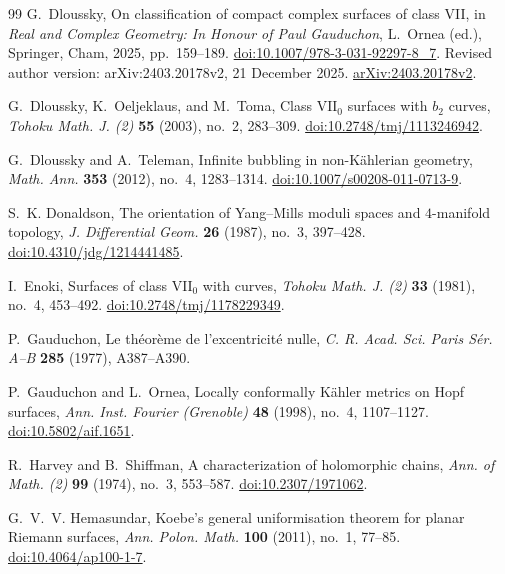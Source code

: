 \begin{thebibliography}{99}
G.~Dloussky, On classification of compact complex surfaces of class VII,
in \emph{Real and Complex Geometry: In Honour of Paul Gauduchon},
L.~Ornea (ed.), Springer, Cham, 2025, pp.~159--189.
\href{https://doi.org/10.1007/978-3-031-92297-8_7}{doi:10.1007/978-3-031-92297-8\_7}.
Revised author version: arXiv:2403.20178v2, 21 December 2025.
\href{https://arxiv.org/abs/2403.20178v2}{arXiv:2403.20178v2}.

G.~Dloussky, K.~Oeljeklaus, and M.~Toma,
Class $\mathrm{VII}_0$ surfaces with $b_2$ curves,
\emph{Tohoku Math. J. (2)} \textbf{55} (2003), no.~2, 283--309.
\href{https://doi.org/10.2748/tmj/1113246942}{doi:10.2748/tmj/1113246942}.

G.~Dloussky and A.~Teleman, Infinite bubbling in non-K\"ahlerian geometry,
\emph{Math. Ann.} \textbf{353} (2012), no.~4, 1283--1314.
\href{https://doi.org/10.1007/s00208-011-0713-9}{doi:10.1007/s00208-011-0713-9}.

S.~K. Donaldson, The orientation of Yang--Mills moduli spaces and
$4$-manifold topology,
\emph{J. Differential Geom.} \textbf{26} (1987), no.~3, 397--428.
\href{https://doi.org/10.4310/jdg/1214441485}{doi:10.4310/jdg/1214441485}.

I.~Enoki, Surfaces of class $\mathrm{VII}_0$ with curves,
\emph{Tohoku Math. J. (2)} \textbf{33} (1981), no.~4, 453--492.
\href{https://doi.org/10.2748/tmj/1178229349}{doi:10.2748/tmj/1178229349}.

P.~Gauduchon, Le th\'eor\`eme de l'excentricit\'e nulle,
\emph{C. R. Acad. Sci. Paris S\'er. A--B} \textbf{285} (1977), A387--A390.

P.~Gauduchon and L.~Ornea, Locally conformally K\"ahler metrics on Hopf surfaces,
\emph{Ann. Inst. Fourier (Grenoble)} \textbf{48} (1998), no.~4, 1107--1127.
\href{https://doi.org/10.5802/aif.1651}{doi:10.5802/aif.1651}.

R.~Harvey and B.~Shiffman, A characterization of holomorphic chains,
\emph{Ann. of Math. (2)} \textbf{99} (1974), no.~3, 553--587.
\href{https://doi.org/10.2307/1971062}{doi:10.2307/1971062}.

G.~V.~V. Hemasundar, Koebe's general uniformisation theorem for
planar Riemann surfaces,
\emph{Ann. Polon. Math.} \textbf{100} (2011), no.~1, 77--85.
\href{https://doi.org/10.4064/ap100-1-7}{doi:10.4064/ap100-1-7}.


\end{thebibliography}
